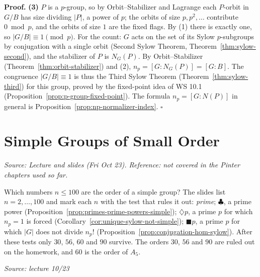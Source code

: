\documentclass[11pt]{report}
\renewenvironment{proof}[1][Proof]{\noindent\textbf{#1.} }{\hfill$\square$\par\vspace{5pt}}
\newcommand{\srcline}[1]{\par\hfill{\footnotesize\textit{Source: #1}}}
\begin{document}
\begin{proof}
\textbf{(3)} $P$ is a $p$-group, so by Orbit--Stabilizer and Lagrange each $P$-orbit in $G/B$ has size dividing $|P|$, a power of $p$; the orbits of size $p, p^2, \ldots$ contribute $0 \bmod p$, and the orbits of size $1$ are the fixed flags. By (1) there is exactly one, so $|G/B| \equiv 1 \pmod p$. For the count: $G$ acts on the set of its Sylow $p$-subgroups by conjugation with a single orbit (Second Sylow Theorem, Theorem~\ref{thm:sylow-second}), and the stabilizer of $P$ is $N_G(P)$. By Orbit--Stabilizer (Theorem~\ref{thm:orbit-stabilizer}) and (2), $n_p = [G : N_G(P)] = [G : B]$. The congruence $|G/B| \equiv 1$ is thus the Third Sylow Theorem (Theorem~\ref{thm:sylow-third}) for this group, proved by the fixed-point idea of WS 10.1 (Proposition~\ref{prop:p-group-fixed-point}). The formula $n_p = [G : N(P)]$ in general is Proposition~\ref{prop:np-normalizer-index}.
\end{proof}


\section{Simple Groups of Small Order}\label{sec:small-simple-groups}

\textit{Source: Lecture and slides (Fri Oct 23). Reference: not covered in the Pinter chapters used so far.}

\begin{rembox}\label{rem:simplicity-game}
Which numbers $n \leq 100$ are the order of a simple group? The slides list $n = 2, \ldots, 100$ and mark each $n$ with the test that rules it out: \emph{prime}; $\clubsuit$, a prime power (Proposition~\ref{prop:primes-prime-powers-simple}); $\diamondsuit p$, a prime $p$ for which $n_p = 1$ is forced (Corollary~\ref{cor:unique-sylow-not-simple}); $\blacksquare p$, a prime $p$ for which $|G|$ does not divide $n_p!$ (Proposition~\ref{prop:conjugation-hom-sylow}). After these tests only $30$, $56$, $60$ and $90$ survive. The orders $30$, $56$ and $90$ are ruled out on the homework, and $60$ is the order of $A_5$.
\srcline{lecture 10/23}
\end{rembox}
\end{document}

